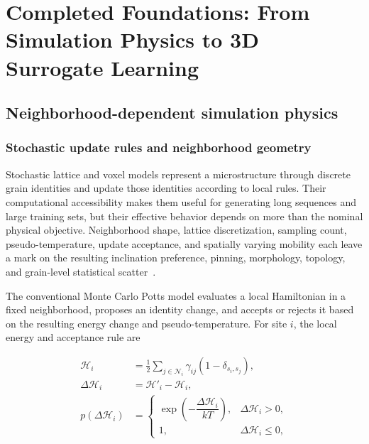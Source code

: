 \documentclass[proposalMode]{ufdissertation}
\begin{document}
\chapter{Completed Foundations: From Simulation Physics to 3D Surrogate Learning}

\section{Neighborhood-dependent simulation physics}
\label{sec:neighborhood-physics}

\subsection{Stochastic update rules and neighborhood geometry}

Stochastic lattice and voxel models represent a microstructure through discrete grain identities and update those identities according to local rules. Their computational accessibility makes them useful for generating long sequences and large training sets, but their effective behavior depends on more than the nominal physical objective. Neighborhood shape, lattice discretization, sampling count, pseudo-temperature, update acceptance, and spatially varying mobility each leave a mark on the resulting inclination preference, pinning, morphology, topology, and grain-level statistical scatter~\cite{wu1982potts,anderson1984kinetics,srolovitz1984topology,holm1998mobility,melville2024modefilter,tian2026neighborhood}.

The conventional Monte Carlo Potts model evaluates a local Hamiltonian in a fixed neighborhood, proposes an identity change, and accepts or rejects it based on the resulting energy change and pseudo-temperature. For site \(i\), the local energy and acceptance rule are

\begin{equation}
\begin{aligned}
\mathcal{H}_i
&=
\frac{1}{2}\sum_{j\in\mathcal{N}_i}
\gamma_{ij}\left(1-\delta_{s_i,s_j}\right),\\
\Delta\mathcal{H}_i
&=
\mathcal{H}'_i-\mathcal{H}_i,\\
p(\Delta\mathcal{H}_i)
&=
\begin{cases}
\exp\!\left(-\dfrac{\Delta\mathcal{H}_i}{kT}\right),
& \Delta\mathcal{H}_i>0,\\[4pt]
1, & \Delta\mathcal{H}_i\le 0,
\end{cases}
\end{aligned}
\label{eq:mcp-update}
\end{equation}
\end{document}
